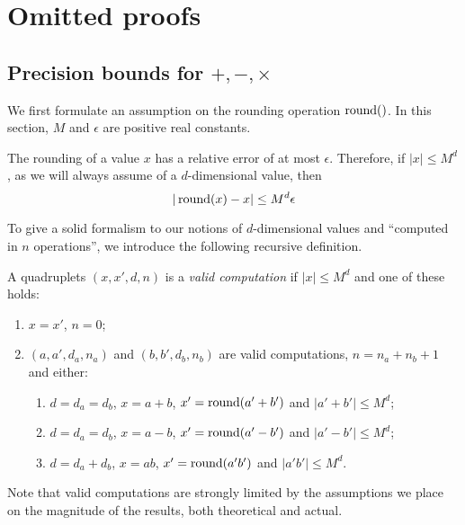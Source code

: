 \chapter{Omitted proofs}
\section{Precision bounds for $+,-,\times$}\label{sec:proof-precision}

We first formulate an assumption on the rounding operation $\operatorname{round}()$. In this section, $M$ and $\epsilon$ are positive real constants.
\begin{assum}
The rounding of a value $x$ has a relative error of at most $\epsilon$. Therefore, if $|x| \leq M^d$, as we will always assume of a $d$-dimensional value, then
\[|\operatorname{round}(x)-x| \leq M^d\epsilon\]
\end{assum}

To give a solid formalism to our notions of $d$-dimensional values and ``computed in $n$ operations'', we introduce the following recursive definition.
\begin{mydef}\label{def:valid-computation}
A quadruplets $(x,x',d,n)$ is a \emph{valid computation} if $|x| \leq M^d$ and one of these holds:
\begin{enumerate}[label={(\alph*)}]
\item $x = x'$, $n=0$;
\item $(a,a',d_a,n_a)$ and $(b,b',d_b,n_b)$ are valid computations, $n = n_a+n_b+1$ and either:
    \begin{enumerate}[label={(\roman*)}]
    \item $d=d_a=d_b$, $x=a+b$, $x'=\operatorname{round}(a'+b')$ and $|a'+b'| \leq M^d$;
    \item $d=d_a=d_b$, $x=a-b$, $x'=\operatorname{round}(a'-b')$ and $|a'-b'| \leq M^d$;
    \item $d=d_a+d_b$, $x=ab$, $x'=\operatorname{round}(a'b')$ and $|a'b'| \leq M^d$.
    \end{enumerate}
\end{enumerate}
\end{mydef}

Note that valid computations are strongly limited by the assumptions we place on the magnitude of the results, both theoretical and actual.

